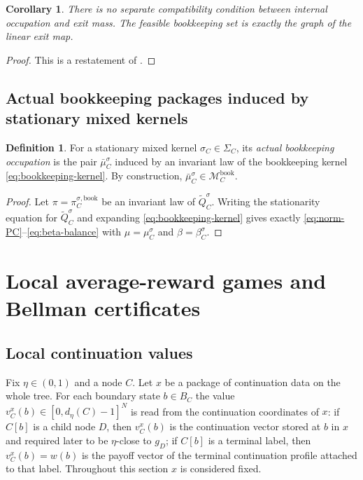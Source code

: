 \documentclass[12pt]{article}
\newtheorem{corollary}[theorem]{Corollary}
\theoremstyle{definition}
\newtheorem{definition}[theorem]{Definition}
\newcommand{\1}{\mathbf{1}}
\newcommand{\cM}{\mathcal{M}}
\begin{document}
\begin{corollary}
\label{cor:no-vp3}
There is no separate compatibility condition between internal occupation and exit
mass. The feasible bookkeeping set is exactly the graph of the linear exit map.
\end{corollary}

\begin{proof}
This is a restatement of .
\end{proof}

\subsection{Actual bookkeeping packages induced by stationary mixed kernels}

\begin{definition}
\label{def:actual-local-package}
For a stationary mixed kernel $\sigma_C\in\Sigma_C$, its \emph{actual bookkeeping
occupation} is the pair $\bar\mu_C^{\sigma}$ induced by an invariant law of the
bookkeeping kernel \eqref{eq:bookkeeping-kernel}. By construction,
$\bar\mu_C^{\sigma}\in \cM_C^{\mathrm{book}}$.
\end{definition}

\begin{proof}
Let $\pi=\pi_C^{\sigma,\mathrm{book}}$ be an invariant law of
$\widetilde Q_C^{\sigma}$. Writing the stationarity equation for
$\widetilde Q_C^{\sigma}$ and expanding \eqref{eq:bookkeeping-kernel} gives
exactly \eqref{eq:norm-PC}--\eqref{eq:beta-balance} with
$\mu=\mu_C^{\sigma}$ and $\beta=\beta_C^{\sigma}$.
\end{proof}

\section{Local average-reward games and Bellman certificates}
\label{sec:local}

\subsection{Local continuation values}

Fix $\eta\in(0,1)$ and a node $C$. Let $x$ be a package of continuation data on the
whole tree. For each boundary state $b\in B_C$ the value
$v_C^x(b)\in[0,d_\eta(C)-1]^N$ is read from the continuation coordinates of $x$:
if $C[b]$ is a child node $D$, then $v_C^x(b)$ is the continuation vector stored
at $b$ in $x$ and required later to be $\eta$-close to $g_D$; if $C[b]$ is a
terminal label, then $v_C^x(b)=w(b)$ is the payoff vector of the terminal
continuation profile attached to that label. Throughout this section $x$ is
considered fixed.
\end{document}
